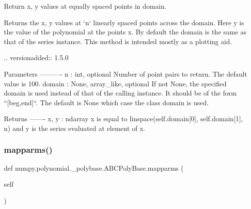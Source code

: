 \begin{DoxyVerb}Return x, y values at equally spaced points in domain.

Returns the x, y values at `n` linearly spaced points across the
domain.  Here y is the value of the polynomial at the points x. By
default the domain is the same as that of the series instance.
This method is intended mostly as a plotting aid.

.. versionadded:: 1.5.0

Parameters
----------
n : int, optional
    Number of point pairs to return. The default value is 100.
domain : {None, array_like}, optional
    If not None, the specified domain is used instead of that of
    the calling instance. It should be of the form ``[beg,end]``.
    The default is None which case the class domain is used.

Returns
-------
x, y : ndarray
    x is equal to linspace(self.domain[0], self.domain[1], n) and
    y is the series evaluated at element of x.\end{DoxyVerb}
 \mbox{\label{classnumpy_1_1polynomial_1_1__polybase_1_1ABCPolyBase_abf63d55fa6cbba79e5c05e6bdf40449b}} 
\subsubsection{\texorpdfstring{mapparms()}{mapparms()}}
{\footnotesize\ttfamily def numpy.\+polynomial.\+\_\+polybase.\+A\+B\+C\+Poly\+Base.\+mapparms (\begin{DoxyParamCaption}\item[{}]{self }\end{DoxyParamCaption})}

